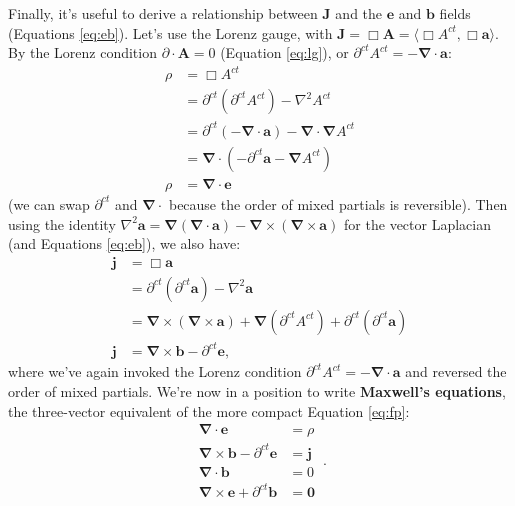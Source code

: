 \documentclass[12pt]{article}
\renewcommand{\vv}[1]{\mathbf{#1}}
\newcommand{\del}{\boldsymbol{\nabla}}
\begin{document}
Finally, it's useful to derive a relationship between $\vv J$ and the $\vv e$ and $\vv b$ fields (Equations \ref{eq:eb}). Let's use the Lorenz gauge, with $\vv J= \Box \vv A = \langle \Box A^{ct}, \Box \vv a \rangle$. By the Lorenz condition ${\partialup \cdot \vv A = 0}$ (Equation \ref{eq:lg}), or $\partial^{ct} A^{ct} = - \del \cdot \vv a$:
\begin{equation}\label{eq:ace}
\begin{split}
\rho &= \Box A^{ct} \\
&= \partial^{ct} (\partial^{ct} A^{ct}) - \nabla ^2 A^{ct} \\
&= \partial^{ct} (- \del \cdot \vv a) - \del \cdot \del A^{ct} \\
&= \del \cdot (- \partial^{ct} \vv a - \del A^{ct}) \\
\rho &= \del \cdot \vv e
\end{split}
\end{equation}
(we can swap $\partial^{ct}$ and $\del \cdot$ because the order of mixed partials is reversible). Then using the identity ${\nabla ^2 \vv a = \del(\del \cdot \vv a) - \del \times (\del \times \vv a)}$ for the vector Laplacian (and Equations \ref{eq:eb}), we also have:
\begin{equation}\label{eq:abe}
\begin{split}
\vv j &= \Box \vv a \\
&= \partial^{ct} (\partial^{ct} \vv a) - \nabla ^2 \vv a \\
&= \del \times (\del \times \vv a) + \del(\partial^{ct} A^{ct}) + \partial^{ct} (\partial^{ct} \vv a) \\
\vv j &=  \del \times \vv b - \partial^{ct} \vv e ,
\end{split}
\end{equation}
where we've again invoked the Lorenz condition $\partial^{ct} A^{ct} = - \del \cdot \vv a$ and reversed the order of mixed partials. We're now in a position to write \textbf{Maxwell's equations}, the three-vector equivalent of the more compact Equation \ref{eq:fp}:
\begin{equation}\label{eq:me}
\boxed{
\begin{aligned}
\del \cdot \vv e &= \rho \\
\del \times \vv b - \partial^{ct} \vv e &= \vv j \\ 
\del \cdot \vv b &= 0 \\
\del \times \vv e + \partial^{ct} \vv b &= \vv 0
\end{aligned}
} \, .
\end{equation}
\end{document}
